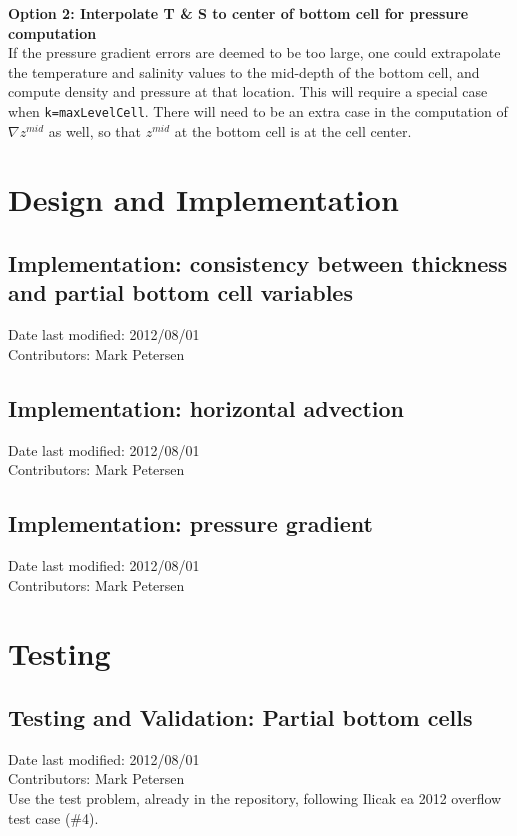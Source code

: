 \documentclass[11pt]{report}
\begin{document}
{\bf Option 2: Interpolate T \& S to center of bottom cell for pressure computation}\\

If the pressure gradient errors are deemed to be too large, one could extrapolate the temperature and salinity values to the mid-depth of the bottom cell, and compute density and pressure at that location.  This will require a special case when {\tt k=maxLevelCell}.  There will need to be an extra case in the computation of $\nabla z^{mid}$ as well, so that $z^{mid}$ at the bottom cell is at the cell center.



\chapter{Design and Implementation}

\section{Implementation: consistency between thickness and partial bottom cell variables}
Date last modified: 2012/08/01 \\
Contributors: Mark Petersen \\


\section{Implementation: horizontal advection}
Date last modified: 2012/08/01 \\
Contributors: Mark Petersen \\


\section{Implementation: pressure gradient}
Date last modified: 2012/08/01 \\
Contributors: Mark Petersen \\



\chapter{Testing}

\section{Testing and Validation: Partial bottom cells}
Date last modified: 2012/08/01 \\
Contributors: Mark Petersen \\

Use the test problem, already in the repository, following Ilicak ea 2012 overflow test case (\#4).


\end{document}
